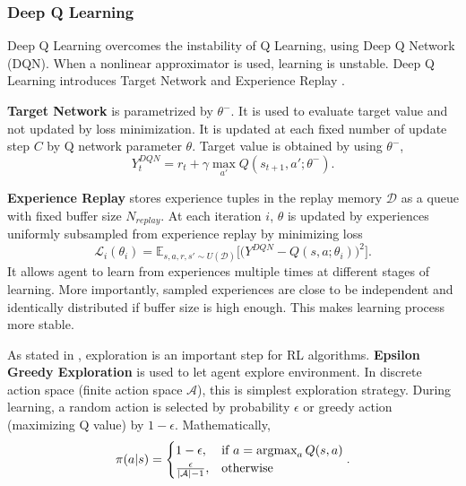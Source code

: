 \subsubsection{Deep Q Learning}
Deep Q Learning overcomes the instability of Q Learning, using Deep Q Network (DQN). 
When a nonlinear approximator is used, learning is unstable. 
Deep Q Learning introduces Target Network and Experience Replay \cite{mnih_human-level_2015, mnih_playing_2013}. 

\textbf{Target Network} is parametrized by $\theta^-$. 
It is used to evaluate target value and not updated by loss minimization. 
It is updated at each fixed number of update step $C$ by Q network parameter $\theta$. 
Target value is obtained by using $\theta^-$, 
\begin{equation}
\label{eqn:dqn_ntarget}
Y_t^{DQN} = r_t + \gamma \max_{a'} Q(s_{t+1},a';\theta^-).
\end{equation}

\textbf{Experience Replay} stores experience tuples in the replay memory $\mathcal{D}$ as a queue with fixed buffer size $N_{replay}$. 
At each iteration $i$, $\theta$ is updated by experiences uniformly subsampled from experience replay by minimizing loss
\begin{equation}
\label{eqn:dqn_loss}
\mathcal{L}_i(\theta_i) = \mathbb{E}_{s,a,r,s'\sim U(\mathcal{D})}\Big[\big( Y^{DQN} - Q(s,a;\theta_i) \big) ^ 2 \Big].
\end{equation}
It allows agent to learn from experiences multiple times at different stages of learning. More importantly, sampled experiences are close to be independent and identically distributed if buffer size is high enough. 
This makes learning process more stable. 

As stated in , exploration is an important step for RL algorithms. 
\textbf{Epsilon Greedy Exploration} is used to let agent explore environment. 
In discrete action space (finite action space $\mathcal{A}$), this is 
simplest exploration strategy.
During learning, a random action is selected by probability $\epsilon$ or greedy action (maximizing Q value) by $1-\epsilon$. Mathematically,  
\begin{equation}
\label{eqn:egreedy_policy}
\pi(a|s) = 
\begin{cases}
1-\epsilon,   & \text{if } a = \operatorname{\textup{argmax}}_{a} Q(s, a)\\
\frac{\epsilon}{|\mathcal{A}|-1},     & \text{otherwise}
\end{cases}.
\end{equation}


